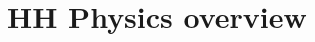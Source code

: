 \chapter{HH Physics overview}
\label{ch:hh-phys}

\def\kl{$\kappa_\lambda$}

\def\figpath{figures/nr-int-note/intro/V1/}



%


